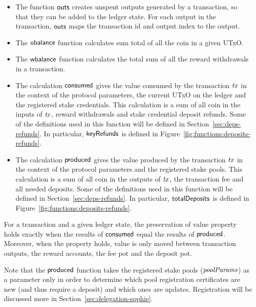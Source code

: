 \begin{itemize}

  \item
    The function $\mathsf{outs}$ creates unspent outputs generated by a transaction, so that
    they can be added to the ledger state.  For each output in the transaction,
    $\mathsf{outs}$ maps the transaction id and output index to the output.

  \item
    The $\mathsf{ubalance}$ function calculates sum total of all the coin in a given UTxO.
  \item
    The $\mathsf{wbalance}$ function calculates the total sum of all the reward withdrawals in a
    transaction.

  \item The calculation $\mathsf{consumed}$ gives the value consumed by the
    transaction $\mathit{tx}$ in the context of the protocol parameters, the
    current UTxO on the ledger and the registered stake credentials. This
    calculation is a sum of all coin in the inputs of $\mathit{tx}$, reward
    withdrawals and stake credential deposit refunds. Some of the definitions
    used in this function will be defined in Section~\ref{sec:deps-refunds}. In particular,
    $\mathsf{keyRefunds}$ is defined in Figure~\ref{fig:functions:deposits-refunds}.

  \item The calculation $\mathsf{produced}$ gives the value produced by the transaction $\mathit{tx}$
    in the context of the protocol parameters and the registered stake pools.
    This calculation is a sum of all coin in the outputs of $\mathit{tx}$,
    the transaction fee and all needed deposits.
    Some of the definitions used in this function will be defined in
    Section~\ref{sec:deps-refunds}.
    In particular, $\mathsf{totalDeposits}$ is defined in Figure~\ref{fig:functions:deposits-refunds}.
\end{itemize}

For a transaction and a given ledger state, the preservation of value property holds
exactly when the results of $\mathsf{consumed}$ equal the results of $\mathsf{produced}$.
Moreover, when the property holds, value is only moved between transaction outputs,
the reward accounts, the fee pot and the deposit pot.

Note that the $\mathsf{produced}$ function takes the registered stake pools ($\mathit{poolParams}$)
as a parameter only in order to determine which pool registration certificates are
new (and thus require a deposit) and which ones are updates.
Registration will be discussed more in Section~\ref{sec:delegation-sophie}.

